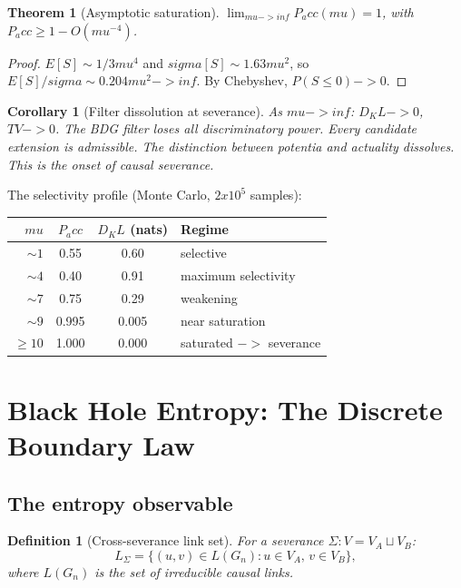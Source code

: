 \documentclass[11pt]{article}
\def\sigma{sigma}%
\def\mu{mu}%
\def\mathrm#1{#1}%
\def\mathbb#1{#1}%
\def\frac#1#2{#1/#2}%
\def\times{x}%
\def\to{->}%
\def\infty{inf}%
\def\Pacc{P_acc}%
\def\Dkl{D_KL}%
\def\TV{TV}%
\newtheorem{definition}{Definition}
\newtheorem{theorem}{Theorem}
\newtheorem{corollary}{Corollary}
\newcommand{\Pacc}{P_{\mathrm{acc}}}
\newcommand{\Dkl}{D_{\mathrm{KL}}}
\newcommand{\TV}{\mathrm{TV}}
\begin{document}
\begin{theorem}[Asymptotic saturation]
\label{thm:saturation}
$\lim_{\mu\to\infty}\Pacc(\mu)=1$, with $\Pacc\ge 1-O(\mu^{-4})$.
\end{theorem}
\begin{proof}
$\mathbb{E}[S]\sim\frac{1}{3}\mu^4$ and $\sigma[S]\sim 1.63\mu^2$, so $\mathbb{E}[S]/\sigma\sim 0.204\mu^2\to\infty$. By Chebyshev, $\mathbb{P}(S\le 0)\to 0$.
\end{proof}

\begin{corollary}[Filter dissolution at severance]
As $\mu\to\infty$: $\Dkl\to 0$, $\TV\to 0$. The BDG filter loses all discriminatory power. Every candidate extension is admissible. The distinction between potentia and actuality dissolves. This is the onset of causal severance.
\end{corollary}

The selectivity profile (Monte Carlo, $2\times 10^5$ samples):

\begin{center}
\begin{tabular}{rccl}
\toprule
$\mu$ & $\Pacc$ & $\Dkl$ (nats) & Regime \\
\midrule
$\sim 1$ & 0.55 & 0.60 & selective \\
$\sim 4$ & 0.40 & 0.91 & maximum selectivity \\
$\sim 7$ & 0.75 & 0.29 & weakening \\
$\sim 9$ & 0.995 & 0.005 & near saturation \\
$\ge 10$ & 1.000 & 0.000 & saturated $\to$ severance \\
\bottomrule
\end{tabular}
\end{center}

\section{Black Hole Entropy: The Discrete Boundary Law}
\label{sec:entropy}

\subsection{The entropy observable}

\begin{definition}[Cross-severance link set]
For a severance $\Sigma:V=V_A\sqcup V_B$:
\[
L_\Sigma=\{(u,v)\in L(G_n):u\in V_A,\,v\in V_B\},
\]
where $L(G_n)$ is the set of irreducible causal links.
\end{definition}
\end{document}
